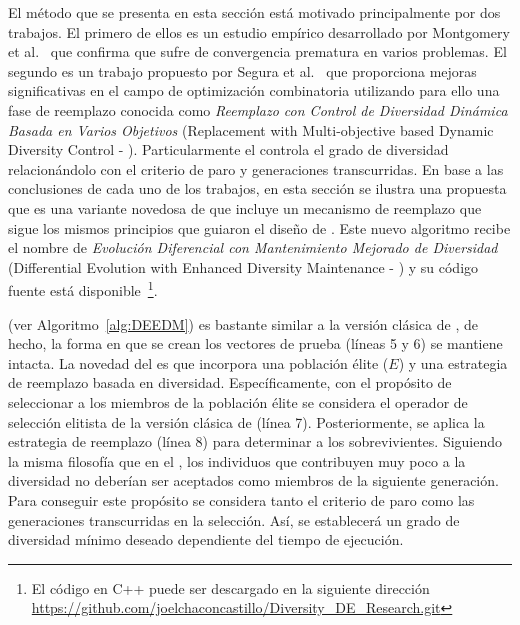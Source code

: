 El método que se presenta en esta sección está motivado principalmente por dos trabajos.
%
El primero de ellos es un estudio empírico desarrollado por Montgomery et al.~\cite{montgomery2012simple} que confirma que 
\DE{} sufre de convergencia prematura en varios problemas.
%
El segundo es un trabajo propuesto por Segura et al.~\cite{segura2016novel} que proporciona mejoras significativas en el campo de optimización combinatoria
utilizando para ello una fase de reemplazo conocida como \textit{Reemplazo con Control de Diversidad Dinámica Basada en Varios Objetivos} 
(Replacement with Multi-objective based Dynamic Diversity Control - \RMDDC{}).
%
Particularmente el \RMDDC{} controla el grado de diversidad relacionándolo con el criterio de paro y generaciones transcurridas.
%
En base a las conclusiones de cada uno de los trabajos, en esta sección se ilustra una propuesta que es una variante novedosa de \DE{} que
incluye un mecanismo de reemplazo que sigue los mismos principios que guiaron el diseño de \RMDDC{}.
%
Este nuevo algoritmo recibe el nombre de \textit{Evolución Diferencial con Mantenimiento Mejorado de Diversidad} 
(Differential Evolution with Enhanced Diversity Maintenance - \DEEDM{}) y su código fuente está disponible~\footnote{El código en C++ puede ser descargado en la siguiente dirección \url{https://github.com/joelchaconcastillo/Diversity\_DE\_Research.git}}.

\DEEDM{} (ver Algoritmo~\ref{alg:DEEDM}) es bastante similar a la versión clásica de \DE{}, de hecho, 
la forma en que se crean los vectores de prueba (líneas 5 y 6) se mantiene intacta.
%
La novedad del \DEEDM{} es que incorpora una población élite ($E$) y una estrategia de reemplazo basada en diversidad.
%
Específicamente, con el propósito de seleccionar a los miembros de la población élite se considera el operador de selección elitista de la versión clásica
de \DE{} (línea 7).
%
Posteriormente, se aplica la estrategia de reemplazo (línea 8) para determinar a los sobrevivientes.
%
Siguiendo la misma filosofía que en el \RMDDC{}, los individuos que contribuyen muy poco a la diversidad no deberían ser aceptados como miembros 
de la siguiente generación.
%
Para conseguir este propósito se considera tanto el criterio de paro como las generaciones transcurridas en la selección.
%
Así, se establecerá un grado de diversidad mínimo deseado dependiente del tiempo de ejecución.

